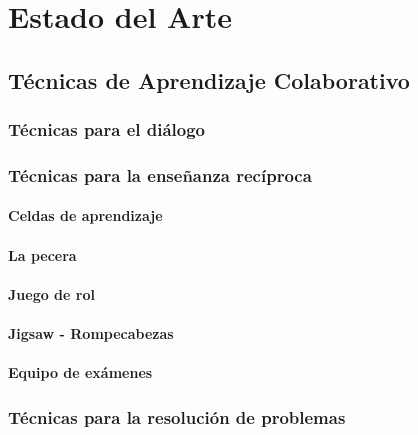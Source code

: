 \chapter{Estado del Arte}
\section{Técnicas de Aprendizaje Colaborativo} 
\subsection{Técnicas para el diálogo}
\subsection{Técnicas para la enseñanza recíproca}
\subsubsection{Celdas de aprendizaje}
\subsubsection{La pecera}
\subsubsection{Juego de rol}
\subsubsection{Jigsaw - Rompecabezas}
\subsubsection{Equipo de exámenes}
\subsection{Técnicas para la resolución de problemas}
